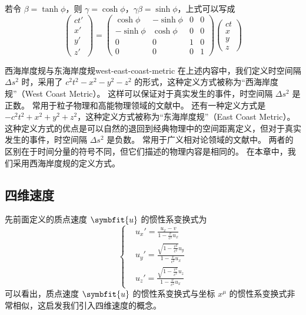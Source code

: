 若令 $\beta = \tanh \phi$，则 $\gamma = \cosh \phi$，$\gamma \beta = \sinh \phi$，上式可以写成
\begin{equation}
    \begin{pmatrix}
        ct' \\
        x'  \\
        y'  \\
        z'
    \end{pmatrix} = \begin{pmatrix}
        \cosh \phi  & -\sinh \phi & 0 & 0 \\
        -\sinh \phi & \cosh \phi  & 0 & 0 \\
        0           & 0           & 1 & 0 \\
        0           & 0           & 0 & 1
    \end{pmatrix} \begin{pmatrix}
        ct \\
        x  \\
        y  \\
        z
    \end{pmatrix}
\end{equation}

\begin{note}{西海岸度规与东海岸度规}{west-east-coast-metric}
    在上述内容中，我们定义时空间隔 $\Delta s^2$ 时，采用了 $c^2 t^2 - x^2 - y^2 - z^2$ 的形式，这种定义方式被称为“西海岸度规”（West Coast Metric）。
    这样可以保证对于真实发生的事件，时空间隔 $\Delta s^2$ 是正数。
    常用于粒子物理和高能物理领域的文献中。
    还有一种定义方式是 $-c^2 t^2 + x^2 + y^2 + z^2$，这种定义方式被称为“东海岸度规”（East Coast Metric）。
    这种定义方式的优点是可以自然的退回到经典物理中的空间距离定义，但对于真实发生的事件，时空间隔 $\Delta s^2$ 是负数。
    常用于广义相对论领域的文献中。
    两者的区别在于时间分量的符号不同，但它们描述的物理内容是相同的。
    在本章中，我们采用西海岸度规的定义方式。
\end{note}

\subsection{四维速度}

先前面定义的质点速度 $\symbfit{u}$ 的惯性系变换式为
\begin{equation}
    \left\{
    \begin{aligned}
         & u_x' = \frac{u_x - v}{1 - \frac{v}{c^2} u_x}                        \\
         & u_y' = \frac{\sqrt{1 - \frac{v^2}{c^2}} u_y}{1 - \frac{v}{c^2} u_x} \\
         & u_z' = \frac{\sqrt{1 - \frac{v^2}{c^2}} u_z}{1 - \frac{v}{c^2} u_x}
    \end{aligned}
    \right.
\end{equation}
可以看出，质点速度 $\symbfit{u}$ 的惯性系变换式与坐标 $x^\mu$ 的惯性系变换式非常相似，这启发我们引入四维速度的概念。

